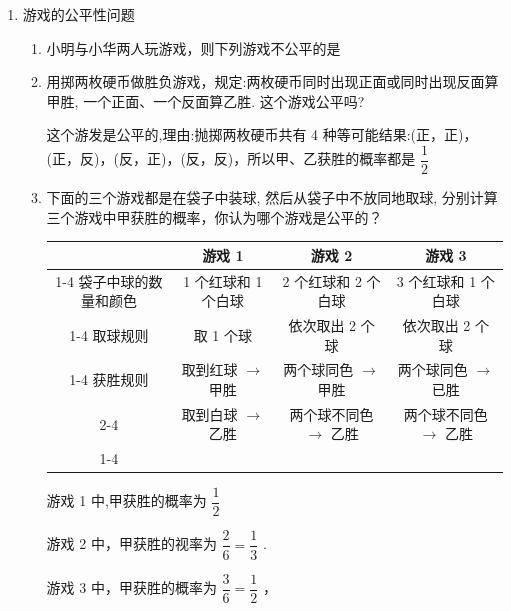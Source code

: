 \begin{enumerate}
    \item 游戏的公平性问题
    \begin{enumerate}
        \item 小明与小华两人玩游戏，则下列游戏不公平的是
        
        \item 用掷两枚硬币做胜负游戏，规定:两枚硬币同时出现正面或同时出现反面算甲胜, 一个正面、一个反面算乙胜. 这个游戏公平吗?
        \begin{jieda}
            这个游发是公平的,理由:抛掷两枚硬币共有 4 种等可能结果:(正，正)，(正，反)，(反，正)，(反，反)，所以甲、乙获胜的概率都是 $\dfrac{1}{2}$
        \end{jieda}
        \item 下面的三个游戏都是在袋子中装球, 然后从袋子中不放同地取球, 分别计算三个游戏中甲获胜的概率，你认为哪个游戏是公平的？
        \begin{center}
        \begin{tabular}{|c|c|c|c|}
        \hline
        \phantom{X} & 游戏 1 & 游戏 2 & 游戏 3 \\
        \cline{1-4}
        袋子中球的数量和颜色 & 1 个红球和 1 个白球 & 2 个红球和 2 个白球 & 3 个红球和 1 个白球 \\
        \cline{1-4}
        取球规则 & 取 1 个球 & 依次取出 2 个球 & 依次取出 2 个球 \\
        \cline{1-4}
        {获胜规则} & 取到红球 $\rightarrow$ 甲胜 & 两个球同色 $\rightarrow$ 甲胜 & 两个球同色 $\rightarrow$ 已胜 \\
        \cline{2-4}
         & 取到白球 $\rightarrow$ 乙胜 & 两个球不同色 $\rightarrow$ 乙胜 & 两个球不同色 $\rightarrow$ 乙胜 \\
        \cline{1-4}
        \hline
        \end{tabular}
        \end{center}
        \begin{jieda}
            游戏 1 中,甲获胜的概率为 $\dfrac{1}{2}$
            
            游戏 2 中，甲获胜的视率为 $\dfrac{2}{6} = \dfrac{1}{3}$ .
            
            游戏 3 中，甲获胜的概率为 $\dfrac{3}{6} = \dfrac{1}{2}$ ，
            

\end{jieda}
\end{enumerate}
\end{enumerate}
